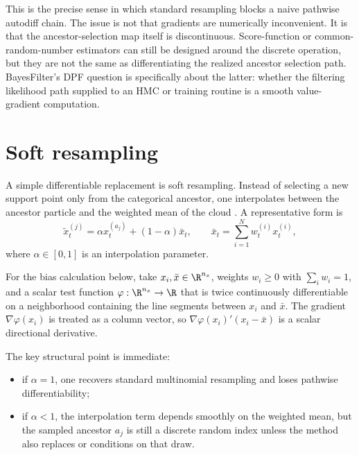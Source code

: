 This is the precise sense in which standard resampling blocks a naive pathwise
autodiff chain.  The issue is not that gradients are numerically inconvenient.
It is that the ancestor-selection map itself is discontinuous.  Score-function
or common-random-number estimators can still be designed around the discrete
operation, but they are not the same as differentiating the realized ancestor
selection path.  BayesFilter's DPF question is specifically about the latter:
whether the filtering likelihood path supplied to an HMC or training routine is
a smooth value-gradient computation.

\section{Soft resampling}
\label{sec:bf-dr-soft-resampling}

A simple differentiable replacement is soft resampling.  Instead of selecting a
new support point only from the categorical ancestor, one interpolates between
the ancestor particle and the weighted mean of the cloud
\citep{zhumurphyjonschkowski2020}.  A representative form is
\begin{equation}
\label{eq:bf-dr-soft-resampling}
  \tilde x_t^{(j)}
  = \alpha x_t^{(a_j)} + (1-\alpha)\bar x_t,
  \qquad
  \bar x_t = \sum_{i=1}^N w_t^{(i)}x_t^{(i)},
\end{equation}
where $\alpha \in [0,1]$ is an interpolation parameter.

For the bias calculation below, take $x_i,\bar x\in\R^{n_x}$, weights
$w_i\ge0$ with $\sum_iw_i=1$, and a scalar test function
$\varphi:\R^{n_x}\to\R$ that is twice continuously differentiable on a
neighborhood containing the line segments between $x_i$ and $\bar x$.  The
gradient $\nabla\varphi(x_i)$ is treated as a column vector, so
$\nabla\varphi(x_i)'(x_i-\bar x)$ is a scalar directional derivative.

The key structural point is immediate:
\begin{itemize}
  \item if $\alpha=1$, one recovers standard multinomial resampling and loses
    pathwise differentiability;
  \item if $\alpha<1$, the interpolation term depends smoothly on the weighted
    mean, but the sampled ancestor $a_j$ is still a discrete random index unless
    the method also replaces or conditions on that draw.
\end{itemize}

